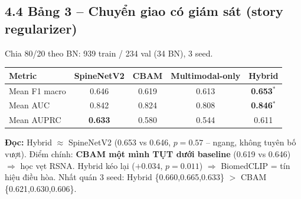 \documentclass[12pt,a4paper]{article}
\begin{document}
\subsection{4.4 Bảng 3 -- Chuyển giao có giám sát (story regularizer)}
Chia 80/20 theo BN: 939 train / 234 val (34 BN), 3 seed.
\begin{center}\small
\begin{tabular}{lcccc}
\toprule
Metric & SpineNetV2 & CBAM & Multimodal-only & Hybrid \\
\midrule
Mean F1 macro & 0.646 & 0.619 & 0.613 & \textbf{0.653}$^\ast$ \\
Mean AUC & 0.842 & 0.824 & 0.808 & \textbf{0.846}$^\ast$ \\
Mean AUPRC & \textbf{0.633} & 0.580 & 0.544 & 0.611 \\
\bottomrule
\end{tabular}
\end{center}
\textbf{Đọc:} Hybrid $\approx$ SpineNetV2 (0.653 vs 0.646, $p=0.57$ -- ngang, không tuyên bố vượt). Điểm chính: \textbf{CBAM một mình TỤT dưới baseline} (0.619 vs 0.646) $\Rightarrow$ học vẹt RSNA. Hybrid kéo lại ($+0.034$, $p=0.011$) $\Rightarrow$ BiomedCLIP = tín hiệu điều hòa. Nhất quán 3 seed: Hybrid \{0.660,0.665,0.633\} $>$ CBAM \{0.621,0.630,0.606\}.
\end{document}
